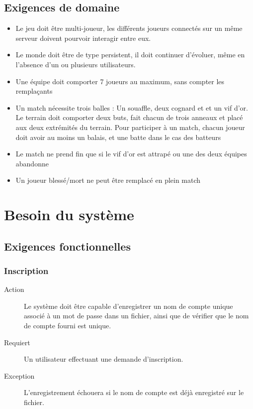 \documentclass[a4paper]{article}
\begin{document}
\subsection{Exigences de domaine}
\begin{itemize}
\item Le jeu doit être multi-joueur, les différents joueurs connectés sur un même \gls{serveur} doivent pourvoir interagir entre eux.
\item Le monde doit être de type persistent, il doit continuer d'évoluer, même en l'absence d'un ou plusieurs \glspl{utilisateur}.
\item Une équipe doit comporter 7 joueurs au maximum, sans compter les remplaçants
\item Un match nécessite trois balles : Un souaffle, deux cognard et  et un vif d'or. Le terrain doit comporter deux buts, fait chacun de trois anneaux et placé aux deux extrémités du terrain. Pour participer à un match, chacun joueur doit avoir au moins un balais, et une batte dans le cas des batteurs
\item Le match ne prend fin que si le vif d'or est attrapé ou une des deux équipes abandonne
\item Un joueur blessé/mort ne peut être remplacé en plein match 
\end{itemize}


\section{Besoin du système}
\subsection{Exigences fonctionnelles}

\subsubsection{Inscription}
\begin{description}
\item[Action] Le système doit être capable d'enregistrer un nom de compte unique associé à un mot de passe dans un fichier, ainsi que de vérifier que le nom de compte fourni est unique.
\item[Requiert] Un \gls{utilisateur} effectuant une demande d'inscription.
\item[Exception] L'enregistrement échouera si le nom de compte est déjà enregistré sur le fichier.
\end{description}
\end{document}
